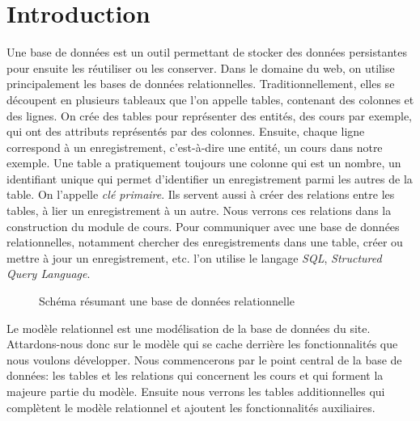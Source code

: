\documentclass[a4paper,10pt,twoside]{sphinxmanual}
\begin{document}
\section{Introduction}
\label{models:introduction}
Une base de données est un outil permettant de stocker des données persistantes pour ensuite les réutiliser ou les conserver. Dans le domaine du web, on utilise principalement les bases de données relationnelles. Traditionnellement, elles se découpent en plusieurs tableaux que l'on appelle tables, contenant des colonnes et des lignes. On crée des tables pour représenter des entités, des cours par exemple, qui ont des attributs représentés par des colonnes. Ensuite, chaque ligne correspond à un enregistrement, c'est-à-dire une entité, un cours dans notre exemple. Une table a pratiquement toujours une colonne  qui est un nombre, un identifiant unique qui permet d'identifier un enregistrement parmi les autres de la table. On l'appelle \emph{clé primaire}. Ils servent aussi à créer des relations entre les tables, à lier un enregistrement à un autre. Nous verrons ces relations dans la construction du module de cours. Pour communiquer avec une base de données relationnelles, notamment chercher des enregistrements dans une table, créer ou mettre à jour un enregistrement, etc. l'on utilise le langage \emph{SQL}, \emph{Structured Query Language}.
\begin{figure}[htbp]
\centering
\capstart

\caption{Schéma résumant une base de données relationnelle}\end{figure}

Le modèle relationnel est une modélisation de la base de données du site. Attardons-nous donc sur le modèle qui se cache derrière les fonctionnalités que nous voulons développer. Nous commencerons par le point central de la base de données: les tables et les relations qui concernent les cours et qui forment la majeure partie du modèle. Ensuite nous verrons les tables additionnelles qui complètent le modèle relationnel et ajoutent les fonctionnalités auxiliaires.
\end{document}
